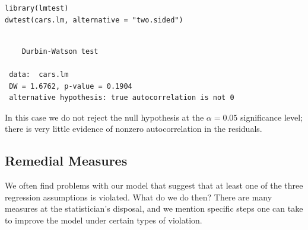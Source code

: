 \documentclass[captions=tableheading]{scrbook}
\begin{document}
\begin{verbatim}
library(lmtest)
dwtest(cars.lm, alternative = "two.sided")
\end{verbatim}

\begin{verbatim}
 
 	Durbin-Watson test
 
 data:  cars.lm 
 DW = 1.6762, p-value = 0.1904
 alternative hypothesis: true autocorrelation is not 0
\end{verbatim}

In this case we do not reject the null hypothesis at the \(\alpha=0.05\) significance level; there is very little evidence of nonzero autocorrelation in the residuals.
\subsection{Remedial Measures}
\label{sec-11-4-4}


We often find problems with our model that suggest that at least one of the three regression assumptions is violated. What do we do then? There are many measures at the statistician's disposal, and we mention specific steps one can take to improve the model under certain types of violation.
\end{document}
